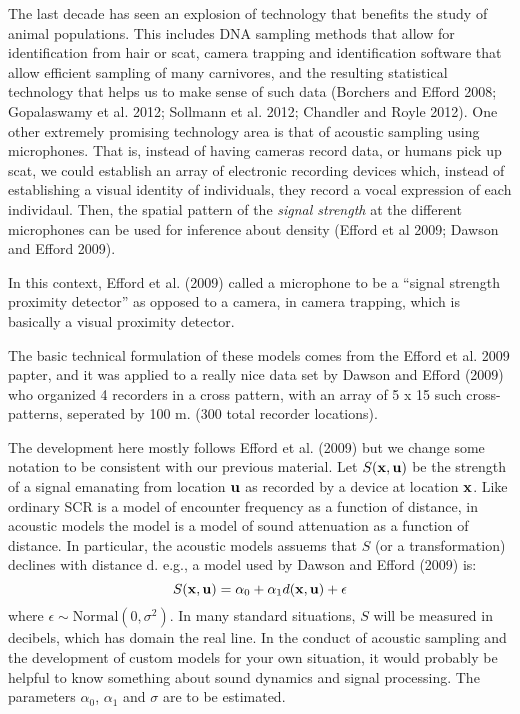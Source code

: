 The last decade has seen an explosion of technology that benefits 
the study of animal populations. This includes DNA sampling methods that
allow for identification from hair or scat, camera trapping and
identification software that allow efficient sampling of many
carnivores, and the resulting statistical technology that helps us
to make sense of such data (Borchers and Efford 2008; Gopalaswamy et
al. 2012; Sollmann et al. 2012; Chandler and Royle 2012). 
One other extremely promising technology area is that of acoustic
sampling using microphones.  That is, instead of having cameras record
data, or humans pick up scat, we could establish an array of
electronic recording devices which, instead of establishing a visual
identity of individuals, they record a vocal expression of each
individaul. Then, the spatial pattern of the {\it signal strength} at
the different microphones can be used for inference about density
(Efford et al 2009; Dawson and Efford 2009).

In this context, Efford et al. (2009) called a microphone 
to be a 
``signal strength proximity detector'' as opposed to a camera, in
camera trapping, which is basically a visual proximity detector. 

The basic technical formulation of these models comes from the Efford
et al. 2009 papter, and it was applied to a 
really nice data set by Dawson and Efford (2009) who organized 4
recorders in a cross pattern, with an array of 5 x 15 such
cross-patterns, seperated by 100 m.  (300 total recorder locations). 

The development here mostly follows Efford et al. (2009) but we change
some notation to be consistent with our previous material.
Let $S({\bf x}, {\bf u})$ be  the strength of a signal emanating from
location ${\bf u}$ as recorded by a device at location ${\bf x}$. 
Like ordinary SCR is a model of encounter frequency as a
function of distance, in acoustic models the model is a model of sound
attenuation as a function of distance.
In particular, the acoustic models 
assuems that $S$ (or a transformation) declines with distance d.
e.g., a model used by Dawson and Efford (2009) is:
\[
S({\bf x},{\bf u})  = \alpha_{0} + \alpha_{1} d({\bf x},{\bf u}) + \epsilon
\]
where $\epsilon \sim \mbox{Normal}(0, \sigma^{2})$. In many standard
situations, $S$ will be measured in decibels, which has domain the
real line.
In the conduct of acoustic sampling and the development of custom
models for your own situation, it would probably be helpful to know
something about sound dynamics and signal processing.
The parameters $\alpha_0$, $\alpha_1$ and $\sigma$ are to be
estimated. 

